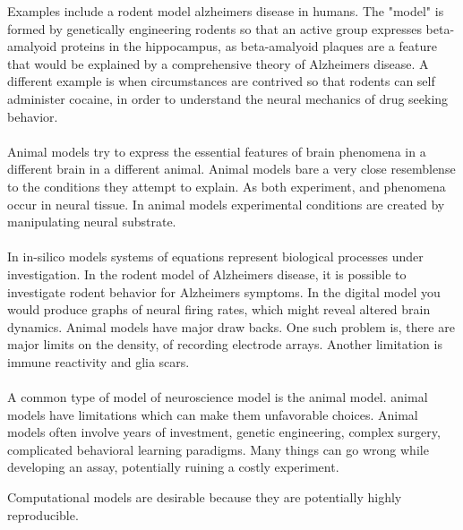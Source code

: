 Examples include a rodent model alzheimers disease in humans. The "model" is formed by 
genetically engineering rodents so that an active group expresses beta-amalyoid proteins in the hippocampus, as beta-amalyoid plaques are a feature that would be explained by a comprehensive theory of Alzheimers disease. A different example is when circumstances are contrived so that rodents can self administer cocaine, in order to understand the neural mechanics of drug seeking behavior.\\
\\
Animal models try to express the essential features of brain phenomena in a different brain in a different animal. Animal models bare a very close resemblense to the conditions they attempt to explain. As both experiment, and phenomena occur in neural tissue. In animal models experimental conditions are created by manipulating neural substrate.\\  
\\
In in-silico models systems of equations represent biological processes under investigation. In the rodent model of Alzheimers disease, it is possible to investigate rodent behavior for Alzheimers symptoms. In the digital model you would produce graphs of neural firing rates, which might reveal altered brain dynamics. Animal models have major draw backs. One such problem is, there are major limits on the density, of recording electrode arrays. Another limitation is immune reactivity and glia scars.\\

\\
A common type of model of neuroscience model is the animal model. animal models have limitations which can make them unfavorable choices. Animal models often involve years of investment, genetic engineering, complex surgery, complicated behavioral learning paradigms. Many things can go wrong while developing an assay, potentially ruining a costly experiment. 

Computational models are desirable because they are potentially highly reproducible.


